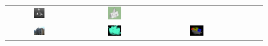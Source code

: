 \documentclass[10pt,twocolumn,letterpaper]{article}
\begin{document}
\begin{figure}[htbp]
\begin{center}
\begin{tabular}{cccccc}
\includegraphics[width=0.18\textwidth]{spitak_9.png} &
\includegraphics[width=0.18\textwidth]{spitak_3.png} \\
\includegraphics[width=0.18\textwidth]{HunterPhoto.jpg} &
\includegraphics[width=0.18\textwidth]{point_cloud.png} &
\includegraphics[width=0.18\textwidth]{TH_7.png} &

\end{tabular}
\end{center}
\end{figure}
\end{document}
